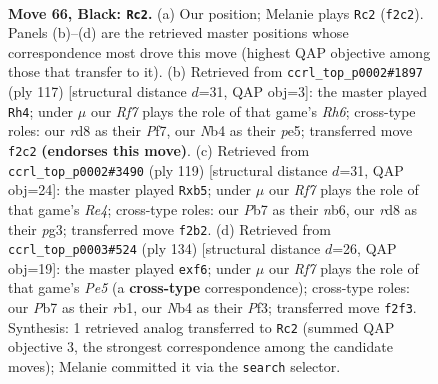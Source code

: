 \documentclass[11pt]{article}
\begin{document}
\clearpage

\begin{figure}[p]\centering
\begin{subfigure}{0.46\textwidth}\centering
\resizebox{\linewidth}{!}{%
\newchessgame
\chessboard[
  setfen={3R4/1p5p/1k4pP/p4p2/1n3P2/6K1/5r2/4R3 b - - 20 66},
  showmover=false,
  pgfstyle=straightmove, color=movearrow, markmove={f2-c2}
]}
\caption{}
\end{subfigure}\hfill
\begin{subfigure}{0.46\textwidth}\centering
\resizebox{\linewidth}{!}{%
\newchessgame
\chessboard[
  setfen={8/5p2/4p2k/3pP1p1/3P4/p1N4r/2K5/R7 b - - 5 59},
  showmover=false,
  pgfstyle=straightmove, color=movearrow, markmove={h3-h4}
]}
\caption{}
\end{subfigure}
\\[4pt]
\begin{subfigure}{0.46\textwidth}\centering
\resizebox{\linewidth}{!}{%
\newchessgame
\chessboard[
  setfen={8/6pk/1N3p1p/1P2r3/5K1P/6P1/3n4/2R5 b - - 4 60},
  showmover=false,
  pgfstyle=straightmove, color=movearrow, markmove={e5-b5}
]}
\caption{}
\end{subfigure}\hfill
\begin{subfigure}{0.46\textwidth}\centering
\resizebox{\linewidth}{!}{%
\newchessgame
\chessboard[
  setfen={8/2R5/4kpp1/4P3/7p/5P1P/6PK/1r6 w - - 3 68},
  showmover=false,
  pgfstyle=straightmove, color=movearrow, markmove={e5-f6}
]}
\caption{}
\end{subfigure}
\caption{\textbf{Move 66, Black: \texttt{Rc2}.} (a) Our position; Melanie plays \texttt{Rc2} (\texttt{f2c2}). Panels (b)--(d) are the retrieved master positions whose correspondence most drove this move (highest QAP objective among those that transfer to it). (b) Retrieved from \texttt{ccrl\_top\_p0002\#1897} (ply 117) [structural distance $d$=31, QAP obj=3]: the master played \texttt{Rh4}; under $\mu$ our \emph{Rf7} plays the role of that game's \emph{Rh6}; cross-type roles: our \emph{r}d8 as their \emph{P}f7, our \emph{N}b4 as their \emph{p}e5; transferred move \texttt{f2c2} \textbf{(endorses this move)}. (c) Retrieved from \texttt{ccrl\_top\_p0002\#3490} (ply 119) [structural distance $d$=31, QAP obj=24]: the master played \texttt{Rxb5}; under $\mu$ our \emph{Rf7} plays the role of that game's \emph{Re4}; cross-type roles: our \emph{P}b7 as their \emph{n}b6, our \emph{r}d8 as their \emph{p}g3; transferred move \texttt{f2b2}. (d) Retrieved from \texttt{ccrl\_top\_p0003\#524} (ply 134) [structural distance $d$=26, QAP obj=19]: the master played \texttt{exf6}; under $\mu$ our \emph{Rf7} plays the role of that game's \emph{Pe5} (a \textbf{cross-type} correspondence); cross-type roles: our \emph{P}b7 as their \emph{r}b1, our \emph{N}b4 as their \emph{P}f3; transferred move \texttt{f2f3}. Synthesis: 1 retrieved analog transferred to \texttt{Rc2} (summed QAP objective 3, the strongest correspondence among the candidate moves); Melanie committed it via the \texttt{search} selector.}
\label{fig:thought-m131}
\end{figure}
\end{document}
